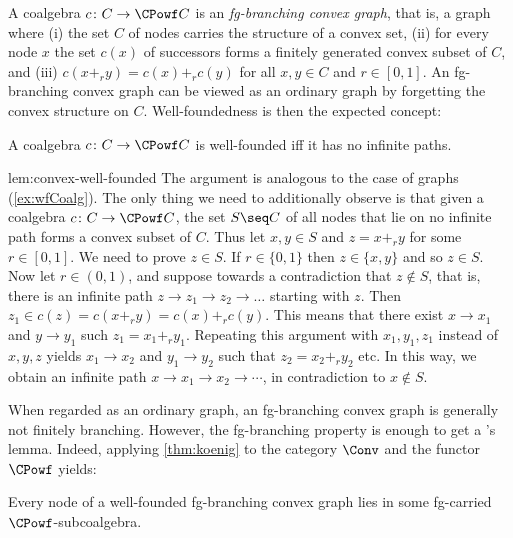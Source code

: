 A coalgebra $c\colon C\to \CPowf C$ is an \emph{fg-branching convex graph}, that is, a graph where (i) the set $C$ of nodes carries the structure of a convex set, (ii) for every node $x$ the set $c(x)$ of successors forms a finitely generated convex subset of $C$, and (iii) $c(x+_r y)=c(x)+_r c(y)$ for all $x,y\in C$ and $r\in [0,1]$. An fg-branching convex graph can be viewed as an ordinary graph by forgetting the convex structure on $C$. Well-foundedness is then the expected concept:

\begin{lemma}\label{lem:convex-well-founded}
A coalgebra $c\colon C\to \CPowf C$ is well-founded iff it has no infinite paths.
\end{lemma}

\begin{proofappendix}{lem:convex-well-founded}
The argument is analogous to the case of graphs (\autoref{ex:wfCoalg}). The only thing we need to additionally observe is that given a coalgebra $c\colon C\to \CPowf C$, the set $S\seq C$ of all nodes that lie on no infinite path forms a convex subset of $C$. Thus let $x,y\in S$ and $z=x+_r y$ for some $r\in [0,1]$. We need to prove $z\in S$. If $r\in \{0,1\}$ then $z\in \{x,y\}$ and so $z\in S$. Now let $r\in (0,1)$, and suppose towards a contradiction that $z\not\in S$, that is, there is an infinite path $z\to z_1 \to z_2\to\ldots$ starting with $z$. Then $z_1\in c(z)=c(x+_r y) = c(x)+_r c(y)$. This means that there exist $x\to x_1$ and $y\to y_1$ such $z_1=x_1+_r y_1$. Repeating this argument with $x_1,y_1,z_1$ instead of $x,y,z$ yields $x_1\to x_2$ and $y_1\to y_2$ such that $z_2=x_2+_r y_2$ etc. In this way, we obtain an infinite path $x\to x_1\to x_2\to \cdots$, in  contradiction to $x\not\in S$.    
\end{proofappendix}



When regarded as an ordinary graph, an fg-branching convex graph is generally not finitely branching. However, the fg-branching property is enough to get a \Konig's lemma. Indeed, applying \autoref{thm:koenig} to the category $\Conv$ and the functor $\CPowf$ yields:

\begin{theorem}\label{thm:koenig-convex}
Every node of a well-founded fg-branching convex graph lies in some fg-carried $\CPowf$-subcoalgebra.
\end{theorem}

